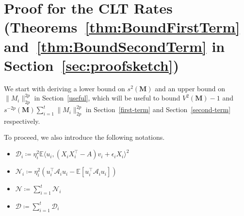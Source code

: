 \documentclass[11pt, reqno,english]{amsart}
\begin{document}
\section{Proof for the CLT Rates (Theorems~\ref{thm:BoundFirstTerm} and~\ref{thm:BoundSecondTerm} in Section~\ref{sec:proofsketch})}

We start with deriving a lower bound on $s^2(\mathbf{M})$ and an upper bound on $\|M_i\|^{2p}_{2p}$ in Section~\ref{useful}, which will be useful to bound $V^2(\mathbf{M}) - 1$ and $s^{-2p}(\mathbf{M})\sum_{i=1}^t\|M_i\|^{2p}_{2p}$ in Section~\ref{first-term} and Section~\ref{second-term} respectively. 

To proceed, we also introduce the following notations.
\begin{itemize}
    \item $\mathcal D_i \coloneqq \eta_i^2 \mathbb{E}\langle u_i, (X_iX^\top_i - A)v_i + \epsilon_i X_i \rangle^2$
    \item $\mathcal N_i \coloneqq \eta_i^2 (u_i^\top \mathcal A_i u_i - \mathbb{E}[u^\top_i \mathcal A_i u_i])$
    \item $\mathcal N \coloneqq \sum_{i = 1}^t\mathcal N_i$
    \item $\mathcal D \coloneqq \sum_{i = 1}^t \mathcal D_i$
\end{itemize}
\end{document}
